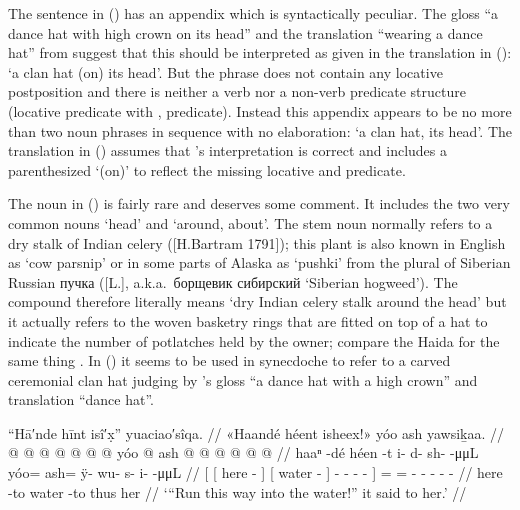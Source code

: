 The sentence in (\lastx) has an appendix  which is syntactically peculiar.
The gloss “a dance hat with high crown on its head” and the translation “wearing a dance hat” from \citeauthor{swanton:1909} suggest that this should be interpreted as given in the translation in (\lastx): ‘a clan hat (on) its head’.
But the phrase  does not contain any locative postposition and there is neither a verb nor a non-verb predicate structure (locative predicate with ,  predicate).
Instead this appendix appears to be no more than two noun phrases in sequence with no elaboration: ‘a clan hat, its head’.
The translation in (\lastx) assumes that \citeauthor{swanton:1909}’s interpretation is correct and includes a parenthesized ‘(on)’ to reflect the missing locative and predicate.

The noun  in (\lastx) is fairly rare and deserves some comment.
It includes the two very common nouns  ‘head’ and  ‘around, about’.
The stem noun  normally refers to a dry stalk of Indian celery ([H.Bartram 1791]); this plant is also known in English as ‘cow parsnip’ or in some parts of Alaska as ‘pushki’ from the plural of Siberian Russian пучка  ([L.], a.k.a.\ борщевик сибирский  ‘Siberian hogweed’).
The compound  therefore literally means ‘dry Indian celery stalk around the head’ but it actually refers to the woven basketry rings that are fitted on top of a hat to indicate the number of potlatches held by the owner; compare the Haida  for the same thing \parencite[511]{enrico:2005}.
In (\lastx) it seems to be used in synecdoche to refer to a carved ceremonial clan hat judging by \citeauthor{swanton:1909}’s gloss “a dance hat with a high crown” and translation “dance hat”.

\ex\label{ex:89-48-run-into-water-it-said}%
%
\begingl
	\glpreamble	“Hā′nde hīnt isî′x̣” yuaciao′sîqa. //
	\glpreamble	«\!Haandé héent isheex!\!» yóo ash yawsiḵaa. //
	\gla	{} {}  @ {} {}
			{}  @ {} {}
			 @ {} @ {} @ {} @ {} @ {} {}
		yóo @ ash @  @ {} @ {} @ {} @ {} @ {} //
	\glb	{} {} haaⁿ -dé {}
			{} héen -t {}
			{} i- d- sh-  -μμL {}
		yóo= ash= ÿ- wu- s- i-  -μμL //
	\glc	{}[ {}[ here - {}]
			{}[ water - {}]
			\· - - -  - {}]
		= = - - - -  - //
	\gld	{} {} here -to {}
			{} water -to {}
			 {} {} {} {} {} {}
		thus her  {} {} {} {} {} //
	\glft	‘“Run this way into the water!” it said to her.’
		//
\endgl
\xe

